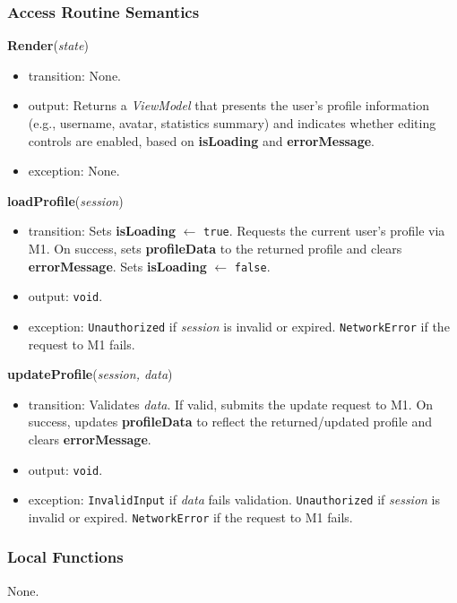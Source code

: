 \documentclass[12pt, titlepage]{article}
\begin{document}
\subsubsection{Access Routine Semantics}

\noindent\textbf{Render}(\textit{state})
\begin{itemize}
    \item transition: None.
    \item output:
    Returns a \textit{ViewModel} that presents the user's profile information (e.g., username, avatar, statistics summary)
    and indicates whether editing controls are enabled, based on \textbf{isLoading} and \textbf{errorMessage}.
    \item exception: None.
\end{itemize}

\noindent\textbf{loadProfile}(\textit{session})
\begin{itemize}
    \item transition:
    Sets \textbf{isLoading} $\leftarrow$ \texttt{true}. Requests the current user's profile via M1.
    On success, sets \textbf{profileData} to the returned profile and clears \textbf{errorMessage}.
    Sets \textbf{isLoading} $\leftarrow$ \texttt{false}.
    \item output: \texttt{void}.
    \item exception:
    \texttt{Unauthorized} if \textit{session} is invalid or expired.
    \texttt{NetworkError} if the request to M1 fails.
\end{itemize}

\noindent\textbf{updateProfile}(\textit{session, data})
\begin{itemize}
    \item transition:
    Validates \textit{data}. If valid, submits the update request to M1.
    On success, updates \textbf{profileData} to reflect the returned/updated profile and clears \textbf{errorMessage}.
    \item output: \texttt{void}.
    \item exception:
    \texttt{InvalidInput} if \textit{data} fails validation.
    \texttt{Unauthorized} if \textit{session} is invalid or expired.
    \texttt{NetworkError} if the request to M1 fails.
\end{itemize}

\subsubsection{Local Functions}
None.
\end{document}
